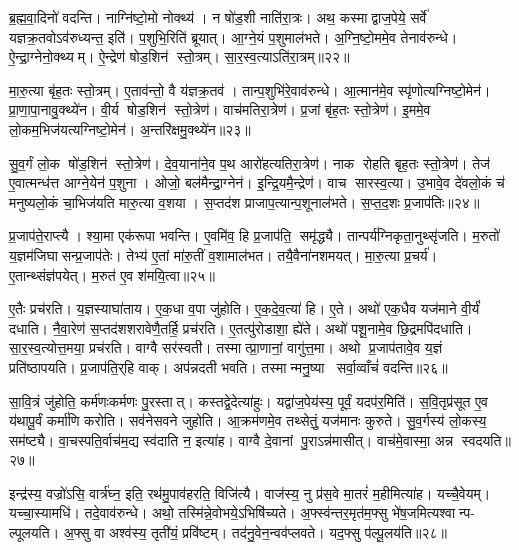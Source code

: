 ब्र॒ह्म॒वा॒दिनो॑ वदन्ति। नाग्नि॑ष्टो॒मो नोक्थ्य॑। न षो॑ड॒शी नाति॑रा॒त्रः। अथ॒ कस्माद्वाज॒पेये॒ सर्वे॑ यज्ञक्र॒तवोऽव॑रुध्यन्त॒ इति॑। प॒शुभि॒रिति॑ ब्रूयात्। आ॒ग्ने॒यं प॒शुमाल॑भते। अ॒ग्नि॒ष्टो॒ममे॒व तेनाव॑रुन्धे। ऐ॒न्द्रा॒ग्नेनो॒क्थ्यम्। ऐ॒न्द्रेण॑ षोड॒शिन॑ स्तो॒त्रम्। सा॒र॒स्व॒त्याऽति॑रा॒त्रम्॥२२॥

मा॒रु॒त्या बृ॑ह॒तः स्तो॒त्रम्। ए॒ताव॑न्तो॒ वै य॑ज्ञक्र॒तव॑। तान्प॒शुभि॑रे॒वाव॑रुन्धे। आ॒त्मान॑मे॒व स्पृ॑णोत्यग्निष्टो॒मेन॑। प्रा॒णा॒पा॒नावु॒क्थ्ये॑न। वी॒र्य षोड॒शिन॑ स्तो॒त्रेण॑। वाच॑मतिरा॒त्रेण॑। प्र॒जां बृ॑ह॒तः स्तो॒त्रेण॑। इ॒ममे॒व लो॒कम॒भिज॑यत्यग्निष्टो॒मेन॑। अ॒न्तरि॑क्षमु॒क्थ्ये॑न॥२३॥

सु॒व॒र्गं लो॒क षो॑ड॒शिन॑ स्तो॒त्रेण॑। दे॒व॒याना॑ने॒व प॒थ आरो॑हत्यतिरा॒त्रेण॑। नाक रोहति बृह॒तः स्तो॒त्रेण॑। तेज॑ ए॒वात्मन्ध॑त्त आग्ने॒येन॑ प॒शुना। ओजो॒ बल॑मैन्द्रा॒ग्नेन॑। इ॒न्द्रि॒यमै॒न्द्रेण॑। वाच सारस्व॒त्या। उ॒भावे॒व दे॑वलो॒कं च॑ मनुष्यलो॒कं चा॒भिज॑यति मारु॒त्या व॒शया। स॒प्तद॑श प्राजाप॒त्यान्प॒शूनाल॑भते। स॒प्त॒द॒शः प्र॒जाप॑तिः॥२४॥

प्र॒जाप॑ते॒राप्त्यै। श्या॒मा एक॑रूपा भवन्ति। ए॒वमि॑व॒ हि प्र॒जाप॑ति॒ समृ॑द्ध्यै। तान्पर्य॑ग्निकृता॒नुथ्सृ॑जति। म॒रुतो॑ य॒ज्ञम॑जिघासन्प्र॒जाप॑तेः। तेभ्य॑ ए॒तां मा॑रु॒तीं व॒शामाल॑भत। तयै॒वैना॑नशमयत्। मा॒रु॒त्या प्र॒चर्य॑। ए॒तान्थ्संज्ञ॑पयेत्। म॒रुत॑ ए॒व श॑मयि॒त्वा॥२५॥

ए॒तैः प्रच॑रति। य॒ज्ञस्याघा॑ताय। ए॒क॒धा व॒पा जु॑होति। ए॒क॒दे॒व॒त्या॑ हि। ए॒ते। अथो॑ एक॒धैव यज॑माने वी॒र्यं॑ दधाति। नै॒वा॒रेण॑ स॒प्तद॑शशरावेणै॒तर्\mbox{}हि॒ प्रच॑रति। ए॒तत्पु॑रोडाशा॒ ह्ये॑ते। अथो॑ पशू॒नामे॒व छि॒द्रमपि॑दधाति। सा॒र॒स्व॒त्योत्त॒मया॒ प्रच॑रति। वाग्वै सर॑स्वती। तस्मात्प्रा॒णानां॒ वागु॑त्त॒मा। अथो प्र॒जाप॑तावे॒व य॒ज्ञं प्रति॑ष्ठापयति। प्र॒जाप॑ति॒र्‌हि वाक्। अप॑न्नदती भवति। तस्मान्मनु॒ष्या सर्वा॒व्वाँचं॑ वदन्ति॥२६॥\anuvakamend[अ॒ति॒रा॒त्रम॒न्तरि॑क्षमु॒क्थ्ये॑न प्र॒जाप॑तिश्शमयि॒त्वोत्त॒मया॒ प्रच॑रति॒ षट् च॑]

सा॒वि॒त्रं जु॑होति॒ कर्म॑णःकर्मणः पु॒रस्तात्। कस्तद्वे॒देत्या॑हुः। यद्वा॑ज॒पेय॑स्य॒ पूर्वं॒ यदप॑र॒मिति॑। स॒वि॒तृप्र॑सूत ए॒व य॑थापू॒र्वं कर्मा॑णि करोति। सव॑नेसवने जुहोति। आ॒क्रम॑णमे॒व तथ्सेतुं॒ यज॑मानः कुरुते। सु॒व॒र्गस्य॑ लो॒कस्य॒ सम॑ष्ट्यै। वा॒चस्पति॒र्वाच॑म॒द्य स्व॑दाति न॒ इत्या॑ह। वाग्वै दे॒वानां पु॒राऽन्न॑मासीत्। वाच॑मे॒वास्मा॒ अन्न स्वदयति॥२७॥

इन्द्र॑स्य॒ वज्रो॑ऽसि॒ वार्त्र॑घ्न॒ इति॒ रथ॑मु॒पाव॑हरति॒ विजि॑त्यै। वाज॑स्य॒ नु प्र॑स॒वे मा॒तरं॑ म॒हीमित्या॑ह। यच्चै॒वेयम्। यच्चा॒स्यामधि॑। तदे॒वाव॑रुन्धे। अथो॒ तस्मि॑न्ने॒वोभये॒ऽभिषि॑च्यते। अ॒फ्स्व॑न्तर॒मृत॑म॒फ्सु भे॑ष॒जमित्यश्वान्प- ल्पूलयति। अ॒फ्सु वा अश्व॑स्य॒ तृती॑यं॒ प्रवि॑ष्टम्। तद॑नु॒वेन॒न्वव॑प्लवते। यद॒फ्सु प॑ल्पू॒लय॑ति॥२८॥

